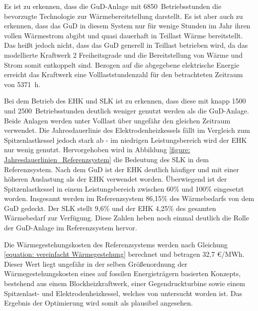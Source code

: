 Es ist zu erkennen, dass die \ac{GuD}-Anlage mit 6850~Betriebsstunden die bevorzugte Technologie zur Wärmebereitstellung darstellt. Es ist aber auch zu erkennen, dass das \ac{GuD} in diesem System nur für wenige Stunden im Jahr ihren vollen Wärmestrom abgibt und quasi dauerhaft in Teillast Wärme bereitstellt. Das heißt jedoch nicht, dass das \ac{GuD} generell in Teillast betrieben wird, da das modellierte Kraftwerk 2 Freiheitsgrade und die Bereitstellung von Wärme und Strom somit entkoppelt sind. Bezogen auf die abgegebene elektrische Energie erreicht das Kraftwerk eine Volllaststundenzahl für den betrachteten Zeitraum von 5371~h. 

Bei dem Betrieb des \ac{EHK} und \ac{SLK} ist zu erkennen, dass diese mit knapp 1500 und 2500~Betriebsstunden deutlich weniger genutzt werden als die \ac{GuD}-Anlage. Beide Anlagen werden unter Volllast über ungefähr den gleichen Zeitraum  verwendet. Die Jahresdauerlinie des Elektrodenheizkessels fällt im Vergleich zum Spitzenlastkessel jedoch stark ab - im niedrigen Leistungsbereich wird der \ac{EHK} nur wenig genutzt. Hervorgehoben wird in Abbildung \ref{figure: Jahresdauerlinien_Referenzsystem} die Bedeutung des \ac{SLK} in dem Referenzsystem. Nach dem \ac{GuD} ist der \ac{EHK} deutlich häufiger und mit einer höheren Auslastung als der \ac{EHK} verwendet worden. Überwiegend ist der Spitzenlastkessel in einem Leistungsbereich zwischen 60\% und 100\% eingesetzt worden. Insgesamt werden im Referenzsystem 86,15\% des Wärmebedarfs von dem \ac{GuD} gedeckt. Der \ac{SLK} stellt 9,6\% und der \ac{EHK} 4,25\% des gesamten Wärmebedarf zur Verfügung. Diese Zahlen heben noch einmal deutlich die Rolle der \ac{GuD}-Anlage im Referenzsystem hervor. 

Die Wärmegestehungskosten des Referenzsystems werden nach Gleichung \ref{equation: vereinfacht Wärmegestehung} berechnet und betragen 32,7 \euro/MWh. Dieser Wert liegt ungefähr in der selben Größenordnung der Wärmegestehungskosten eines auf fossilen Energieträgern basierten Konzepts, bestehend aus einem Blockheizkraftwerk, einer Gegendruckturbine sowie einem Spitzenlast- und Elektrodenheizkessel, welches von \citet{Kaldemeyer2019} untersucht worden ist. Das Ergebnis der Optimierung wird somit als plausibel angesehen.

